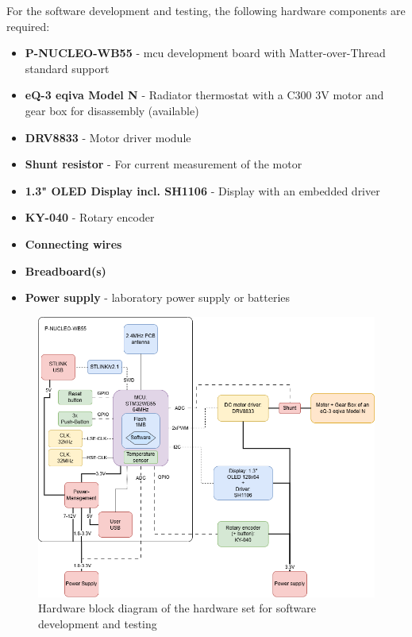 For the software development and testing, the following hardware components are required:

\begin{itemize}
    \item \textbf{P-NUCLEO-WB55} - \acs{mcu} development board with Matter-over-Thread standard support
    \item \textbf{eQ-3 eqiva Model N} - Radiator thermostat with a C300 3V motor and gear box for disassembly (available)
    \item \textbf{DRV8833} - Motor driver module
    \item \textbf{Shunt resistor} - For current measurement of the motor
    \item \textbf{1.3" OLED Display incl. SH1106} - Display with an embedded driver
    \item \textbf{KY-040} - Rotary encoder
    \item \textbf{Connecting wires}
    \item \textbf{Breadboard(s)}
    \item \textbf{Power supply} - laboratory power supply or batteries
\end{itemize}

\begin{figure}[htbp]
    \centering
    \includegraphics[width=1.0\textwidth]{../../electronics/mt-rt-sw-dev-hw-block-diagram.png}
    \caption{Hardware block diagram of the hardware set for software development and testing}
    \label{fig:mt-rt-sw-dev-hw-block-diagram}
\end{figure}
